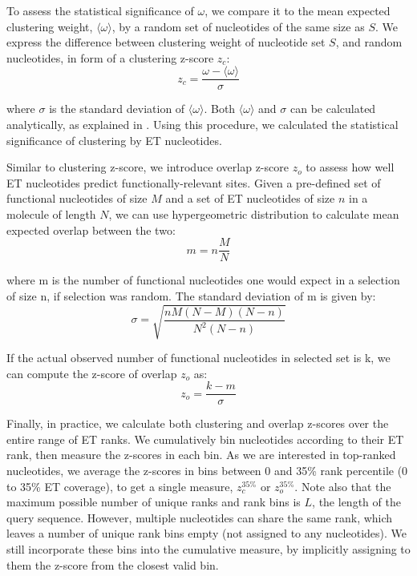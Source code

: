 \documentclass[12pt,a4paper]{report}
\begin{document}
To assess the statistical significance of $\omega$, we compare it to the mean expected clustering weight, $\langle\omega\rangle$, by a random set of nucleotides of the same size as $S$. We express the difference between clustering weight of nucleotide set $S$, and random nucleotides, in form of a clustering z-score $z_c$:
\begin{equation*} \label{eq:zclust_equation}
z_c = \frac{\omega-\langle\omega\rangle}{\sigma}
\tag{5}
\end{equation*}

where $\sigma$ is the standard deviation of $\langle\omega\rangle$. Both $\langle\omega\rangle$ and $\sigma$ can be calculated analytically, as explained in \cite{Mihalek2003}. Using this procedure, we calculated the statistical significance of clustering by ET nucleotides.

Similar to clustering z-score, we introduce overlap z-score $z_o$ to assess how well ET nucleotides predict functionally-relevant sites. Given a pre-defined set of functional nucleotides of size $M$ and a set of ET nucleotides of size $n$ in a molecule of length $N$, we can use hypergeometric distribution to calculate mean expected overlap between the two:
\begin{equation*} \label{eq:hg_exp_equation}
m  = n\frac{M}{N}
\tag{6}
\end{equation*}

where m is the number of functional nucleotides one would expect in a selection of size n, if selection was random. The standard deviation of m is given by:
\begin{equation*} \label{eq:hg_sigma_equation}
\sigma  = \sqrt{\frac{nM(N-M)(N-n)}{N^2(N-n)}}
\tag{7}
\end{equation*}

If the actual observed number of functional nucleotides in selected set is k, we can compute the z-score of overlap  $z_o$ as:
\begin{equation*} \label{eq:zolap_equation}
z_o  = \frac{k-m}{\sigma}
\tag{8}
\end{equation*}

Finally, in practice, we calculate both clustering and overlap z-scores over the entire range of ET ranks.  We cumulatively bin nucleotides according to their ET rank, then measure the z-scores in each bin. As we are interested in top-ranked nucleotides, we average the z-scores in bins between 0 and 35\% rank percentile (0 to 35\% ET coverage), to get a single measure, $z_{c}^{35\%}$ or $z_{o}^{35\%}$. Note also that the maximum possible number of unique ranks and rank bins is $L$, the length of the query sequence. However, multiple nucleotides can share the same rank, which leaves a number of unique rank bins empty (not assigned to any nucleotides). We still incorporate these bins into the cumulative measure, by implicitly assigning to them the z-score from the closest valid bin.
\end{document}
